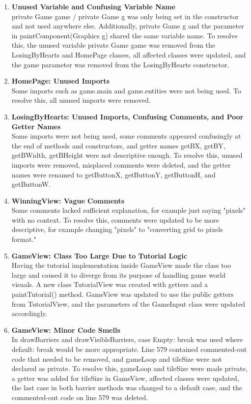 \documentclass[12pt]{article}
\begin{document}
\begin{enumerate}
    \item \textbf{Unused Variable and Confusing Variable Name} \\
    private Game game / private Game g was only being set in the constructor and not used anywhere else. Additionally, private Game g and the parameter in paintComponent(Graphics g) shared the same variable name. To resolve this, the unused variable private Game game was removed from the LosingByHearts and HomePage classes, all affected classes were updated, and the game parameter was removed from the LosingByHearts constructor.

    \item \textbf{HomePage: Unused Imports} \\
    Some imports such as game.main and game.entities were not being used. To resolve this, all unused imports were removed.

    \item \textbf{LosingByHearts: Unused Imports, Confusing Comments, and Poor Getter Names} \\
    Some imports were not being used, some comments appeared confusingly at the end of methods and constructors, and getter names getBX, getBY, getBWidth, getBHeight were not descriptive enough. To resolve this, unused imports were removed, misplaced comments were deleted, and the getter names were renamed to getButtonX, getButtonY, getButtonH, and getButtonW.

    \item \textbf{WinningView: Vague Comments} \\
    Some comments lacked sufficient explanation, for example just saying "pixels" with no context. To resolve this, comments were updated to be more descriptive, for example changing "pixels" to "converting grid to pixels format."

    \item \textbf{GameView: Class Too Large Due to Tutorial Logic} \\
    Having the tutorial implementation inside GameView made the class too large and caused it to diverge from its purpose of handling game world visuals. A new class TutorialView was created with getters and a paintTutorial() method. GameView was updated to use the public getters from TutorialView, and the parameters of the GameInput class were updated accordingly.

    \item \textbf{GameView: Minor Code Smells} \\
    In drawBarriers and drawVisibleBarriers, case Empty: break was used where default: break would be more appropriate. Line 579 contained commented-out code that needed to be removed, and gameLoop and tileSize were not declared as private. To resolve this, gameLoop and tileSize were made private, a getter was added for tileSize in GameView, affected classes were updated, the last case in both barrier methods was changed to a default case, and the commented-out code on line 579 was deleted.
\end{enumerate}
\end{document}
